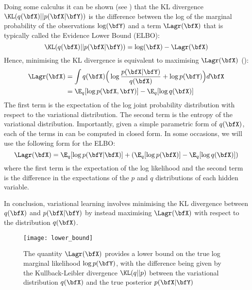 Doing some calculus it can be shown (see \cite{Bishop2006,Murphy}) that the KL divergence $\KL(q(\bfX)||p(\bfX|\bfY))$ is the difference between the log of the marginal probability of the observations $\log(\bfY)$ and a term $\Lagr(\bfX)$ that is typically called the Evidence Lower Bound (ELBO):
\[
	\KL(q(\bfX)||p(\bfX|\bfY)) = \log(\bfX) - \Lagr(\bfX)
\]
Hence, minimising the KL divergence is equivalent to maximising $\Lagr(\bfX)$ ():
\begin{align} \label{eq_elbo1} \begin{split}
	\Lagr(\bfX) &= \int q(\bfX) \Big( \log \frac{p(\bfX|\bfY)}{q(\bfX)} + \log p(\bfY) \Big) d\bfX \\
	&= \E_q [\log p(\bfX,\bfY)] - \E_q [\log q(\bfX)]
\end{split} \end{align}
The first term is the expectation of the log joint probability distribution with respect to the variational distribution. The second term is the entropy of the variational distribution.
Importantly, given a simple parametric form of $q(\bfX)$, each of the terms in  can be computed in closed form. In some occasions, we will use the following form for the ELBO:
\begin{equation} \label{eq_elbo2}
	\Lagr(\bfX) = \E_q [\log p(\bfY|\bfX)] + (\E_q [\log p(\bfX)] - \E_q [\log q(\bfX)])
\end{equation}
where the first term is the expectation of the log likelihood and the second term is the difference in the expectations of the $p$ and $q$ distributions of each hidden variable.

In conclusion, variational learning involves minimising the KL divergence between $q(\bfX)$ and $p(\bfX|\bfY)$ by instead maximising $\Lagr(\bfX)$ with respect to the distribution $q(\bfX)$.

\begin{figure}[H]
	\centering
	\texttt{[image: lower\_bound]}
	\caption{The quantity $\Lagr(\bfX)$ provides a lower bound on the true log marginal likelihood $\log p(\bfY)$, with the difference being given by the Kullback-Leibler divergence $\KL(q||p)$ between the variational distribution $q(\bfX)$ and the true posterior $p(\bfX|\bfY)$}
	\label{fig:ELBO}
\end{figure}

